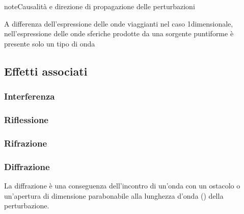 \documentclass[letterpaper,10pt,italian]{jupyterBook}
\begin{document}
\begin{sphinxadmonition}{note}{Causalità e direzione di propagazione delle perturbazioni}

\sphinxAtStartPar
A differenza dell’espressione delle onde viaggianti nel caso 1\sphinxhyphen{}dimensionale, nell’espressione delle onde sferiche prodotte da una sorgente puntiforme è presente solo un tipo di onda
\end{sphinxadmonition}


\subsection{Effetti associati}
\label{\detokenize{ch/waves/phenomena:effetti-associati}}\label{\detokenize{ch/waves/phenomena:physics-hs-waves-effects}}

\subsubsection{Interferenza}
\label{\detokenize{ch/waves/phenomena:interferenza}}\label{\detokenize{ch/waves/phenomena:physics-hs-waves-effects-interference}}

\subsubsection{Riflessione}
\label{\detokenize{ch/waves/phenomena:riflessione}}\label{\detokenize{ch/waves/phenomena:physics-hs-waves-effects-reflection}}

\subsubsection{Rifrazione}
\label{\detokenize{ch/waves/phenomena:rifrazione}}\label{\detokenize{ch/waves/phenomena:physics-hs-waves-effects-refraction}}

\subsubsection{Diffrazione}
\label{\detokenize{ch/waves/phenomena:diffrazione}}\label{\detokenize{ch/waves/phenomena:physics-hs-waves-effects-diffraction}}
\sphinxAtStartPar
La diffrazione è una conseguenza dell’incontro di un’onda con un ostacolo o un’apertura di dimensione parabonabile alla lunghezza d’onda ({\hyperref[\detokenize{ch/waves/phenomena:wave-length}]{}}) della perturbazione.
\end{document}
